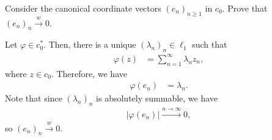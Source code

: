 \documentclass[10pt]{mypackage}
\begin{document}
\begin{exercise}
  Consider the canonical coordinate vectors $\left(e_n\right)_{n\geq 1}$ in $c_0$. Prove that $\left(e_n\right)_n\xrightarrow{w}0$.
\end{exercise}
\begin{solution}
  Let $\varphi\in c_0^{\ast}$. Then, there is a unique $\left(\lambda_{n}\right)_n \in \ell_{1}$ such that
  \begin{align*}
    \varphi\left(z\right) &= \sum_{n=1}^{\infty}\lambda_nz_n,
  \end{align*}
  where $z\in c_0$. Therefore, we have
  \begin{align*}
    \varphi\left(e_n\right) &= \lambda_n.
  \end{align*}
  Note that since $\left(\lambda_n\right)_n$ is absolutely summable, we have
  \begin{align*}
    \left\vert \varphi\left(e_n\right) \right\vert \xrightarrow{n\rightarrow\infty} 0,
  \end{align*}
  so $\left(e_n\right)_n\xrightarrow{w} 0$.
\end{solution}
\end{document}
